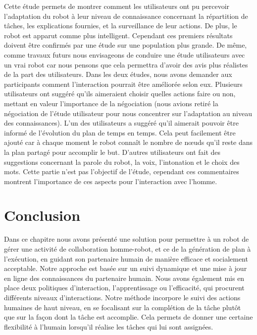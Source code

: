 \documentclass[a4paper,11pt,twoside]{StyleThese}
\begin{document}
Cette étude permets de montrer comment les utilisateurs ont pu percevoir l'adaptation du robot à leur niveau de connaissance concernant la répartition de tâches, les explications fournies, et la surveillance de leur actions. De plus, le robot est apparut comme plus intelligent. Cependant ces premiers résultats doivent être confirmés par une étude sur une population plus grande. De même, comme travaux futurs nous envisageons de conduire une étude utilisateurs avec un vrai robot car nous pensons que cela permettra d'avoir des avis plus réalistes de la part des utilisateurs.
Dans les deux études, nous avons demander aux participants comment l'interaction pourrait être améliorée selon eux.
Plusieurs utilisateurs ont suggéré qu'ils aimeraient choisir quelles actions faire ou non, mettant en valeur l'importance de la négociation (nous avions retiré la négociation de l'étude utilisateur pour nous concentrer sur l'adaptation au niveau des connaissances). L'un des utilisateurs a suggéré qu'il aimerait pouvoir être informé de l'évolution du plan de temps en temps. 
Cela peut facilement être ajouté car à chaque moment le robot connaît le nombre de nœuds qu'il reste dans la plan partagé pour accomplir le but.
D'autres utilisateurs ont fait des suggestions concernant la parole du robot, la voix, l'intonation et le choix des mots. Cette partie n'est pas l'objectif de l'étude, cependant ces commentaires montrent l'importance de ces aspects pour l'interaction avec l'homme.

%






\section{Conclusion}
Dans ce chapitre nous avons présenté une solution pour permettre à un robot de gérer une activité de collaboration homme-robot, et ce de la génération de plan à l'exécution, en guidant son partenaire humain de manière efficace et socialement acceptable.
Notre approche est basée sur un suivi dynamique et une mise à jour en ligne des connaissances du partenaire humain. 
Nous avons également mis en place deux politiques d'interaction, l'apprentissage ou l'efficacité, qui procurent différents niveaux d'interactions. 
Notre méthode incorpore le suivi des actions humaines de haut niveau, en se focalisant sur la complétion de la tâche plutôt que sur la façon dont la tâche est accomplie. Cela permets de donner une certaine flexibilité à l'humain lorsqu'il réalise les tâches qui lui sont assignées.
\end{document}
